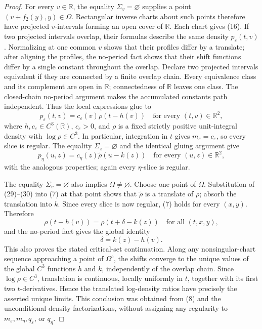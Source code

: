 \documentclass{article}
\begin{document}
\begin{proof}
For every \(v\in\mathbb R\), the equality \(\Sigma_v=\varnothing\) supplies a point \((v+f_2(y),y)\in\Omega\).  Rectangular inverse charts about such points therefore have projected \(v\)-intervals forming an open cover of \(\mathbb R\).  Each chart gives (16).  If two projected intervals overlap, their formulas describe the same density \(p_\varepsilon(t,v)\).  Normalizing at one common \(v\) shows that their profiles differ by a translate; after aligning the profiles, the no-period fact shows that their shift functions differ by a single constant throughout the overlap.  Declare two projected intervals equivalent if they are connected by a finite overlap chain.  Every equivalence class and its complement are open in \(\mathbb R\); connectedness of \(\mathbb R\) leaves one class.  The closed-chain no-period argument makes the accumulated constants path independent.  Thus the local expressions glue to
\[
 p_\varepsilon(t,v)=c_\varepsilon(v)\rho(t-h(v))
 \quad\text{for every }(t,v)\in\mathbb R^2,
\tag{29}
\]
where \(h,c_\varepsilon\in C^3(\mathbb R)\), \(c_\varepsilon>0\), and \(\rho\) is a fixed strictly positive unit-integral density with \(\log\rho\in C^3\).  In particular, integration in \(t\) gives \(m_\varepsilon=c_\varepsilon\), so every slice is regular.  The equality \(\Sigma_z=\varnothing\) and the identical gluing argument give
\[
 p_\eta(u,z)=c_\eta(z)\widetilde\rho(u-k(z))
 \quad\text{for every }(u,z)\in\mathbb R^2,
\tag{30}
\]
with the analogous properties; again every \(\eta\)-slice is regular.

The equality \(\Sigma_v=\varnothing\) also implies \(\Omega\ne\varnothing\).  Choose one point of \(\Omega\).  Substitution of (29)--(30) into (7) at that point shows that \(\widetilde\rho\) is a translate of \(\rho\); absorb the translation into \(k\).  Since every slice is now regular, (7) holds for every \((x,y)\).  Therefore
\[
 \rho(t-h(v))=\rho(t+\delta-k(z))
 \quad\text{for all }(t,x,y),
\]
and the no-period fact gives the global identity
\[
 \delta=k(z)-h(v).
\tag{31}
\]
This also proves the stated critical-set continuation.  Along any nonsingular-chart sequence approaching a point of \(\Omega^c\), the shifts converge to the unique values of the global \(C^3\) functions \(h\) and \(k\), independently of the overlap chain.  Since \(\log\rho\in C^3\), translation is continuous, locally uniformly in \(t\), together with its first two \(t\)-derivatives.  Hence the translated log-density ratios have precisely the asserted unique limits.  This conclusion was obtained from (8) and the unconditional density factorizations, without assigning any regularity to \(m_\varepsilon,m_\eta,q_\varepsilon\), or \(q_\eta\).


\end{proof}
\end{document}
